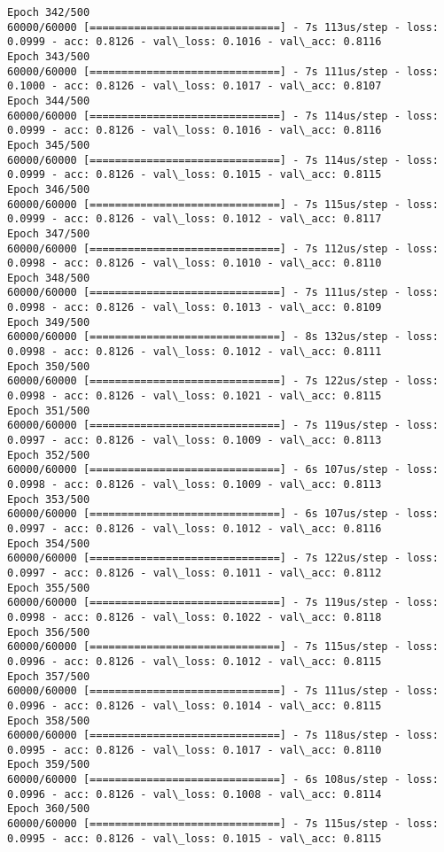 \documentclass[11pt]{article}
\begin{document}
\begin{Verbatim}[commandchars=\\\{\}]
Epoch 342/500
60000/60000 [==============================] - 7s 113us/step - loss: 0.0999 - acc: 0.8126 - val\_loss: 0.1016 - val\_acc: 0.8116
Epoch 343/500
60000/60000 [==============================] - 7s 111us/step - loss: 0.1000 - acc: 0.8126 - val\_loss: 0.1017 - val\_acc: 0.8107
Epoch 344/500
60000/60000 [==============================] - 7s 114us/step - loss: 0.0999 - acc: 0.8126 - val\_loss: 0.1016 - val\_acc: 0.8116
Epoch 345/500
60000/60000 [==============================] - 7s 114us/step - loss: 0.0999 - acc: 0.8126 - val\_loss: 0.1015 - val\_acc: 0.8115
Epoch 346/500
60000/60000 [==============================] - 7s 115us/step - loss: 0.0999 - acc: 0.8126 - val\_loss: 0.1012 - val\_acc: 0.8117
Epoch 347/500
60000/60000 [==============================] - 7s 112us/step - loss: 0.0998 - acc: 0.8126 - val\_loss: 0.1010 - val\_acc: 0.8110
Epoch 348/500
60000/60000 [==============================] - 7s 111us/step - loss: 0.0998 - acc: 0.8126 - val\_loss: 0.1013 - val\_acc: 0.8109
Epoch 349/500
60000/60000 [==============================] - 8s 132us/step - loss: 0.0998 - acc: 0.8126 - val\_loss: 0.1012 - val\_acc: 0.8111
Epoch 350/500
60000/60000 [==============================] - 7s 122us/step - loss: 0.0998 - acc: 0.8126 - val\_loss: 0.1021 - val\_acc: 0.8115
Epoch 351/500
60000/60000 [==============================] - 7s 119us/step - loss: 0.0997 - acc: 0.8126 - val\_loss: 0.1009 - val\_acc: 0.8113
Epoch 352/500
60000/60000 [==============================] - 6s 107us/step - loss: 0.0998 - acc: 0.8126 - val\_loss: 0.1009 - val\_acc: 0.8113
Epoch 353/500
60000/60000 [==============================] - 6s 107us/step - loss: 0.0997 - acc: 0.8126 - val\_loss: 0.1012 - val\_acc: 0.8116
Epoch 354/500
60000/60000 [==============================] - 7s 122us/step - loss: 0.0997 - acc: 0.8126 - val\_loss: 0.1011 - val\_acc: 0.8112
Epoch 355/500
60000/60000 [==============================] - 7s 119us/step - loss: 0.0998 - acc: 0.8126 - val\_loss: 0.1022 - val\_acc: 0.8118
Epoch 356/500
60000/60000 [==============================] - 7s 115us/step - loss: 0.0996 - acc: 0.8126 - val\_loss: 0.1012 - val\_acc: 0.8115
Epoch 357/500
60000/60000 [==============================] - 7s 111us/step - loss: 0.0996 - acc: 0.8126 - val\_loss: 0.1014 - val\_acc: 0.8115
Epoch 358/500
60000/60000 [==============================] - 7s 118us/step - loss: 0.0995 - acc: 0.8126 - val\_loss: 0.1017 - val\_acc: 0.8110
Epoch 359/500
60000/60000 [==============================] - 6s 108us/step - loss: 0.0996 - acc: 0.8126 - val\_loss: 0.1008 - val\_acc: 0.8114
Epoch 360/500
60000/60000 [==============================] - 7s 115us/step - loss: 0.0995 - acc: 0.8126 - val\_loss: 0.1015 - val\_acc: 0.8115

\end{Verbatim}
\end{document}
